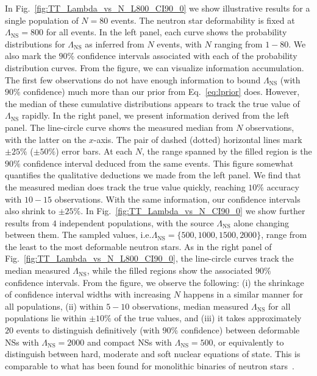 \documentclass[aps,prd,amsmath,floats,floatfix, twocolumn,
superscriptaddress,nofootinbib,showpacs]{revtex4-1}
\newcommand{\lambdans}{\Lambda_\mathrm{NS}}
\begin{document}
In Fig.~\ref{fig:TT_Lambda_vs_N_L800_CI90_0} we show illustrative results
for a single 
population of $N=80$ events. The neutron star deformability is fixed at
$\lambdans=800$ for all events. In the left panel, each curve shows the 
probability distributions for $\lambdans$ as inferred from $N$ events, with $N$
ranging from $1-80$. We also mark the $90\%$ confidence intervals associated
with each of the probability distribution curves. From the figure, we
can visualize information accumulation. The first few observations do not have
enough information to bound $\lambdans$ (with $90\%$ confidence) much more than
our prior from Eq.~\ref{eq:lprior} does. However, the median of these
cumulative distributions appears to track the true value of $\lambdans$ 
rapidly.
% 
In the right panel, we present information derived from the left panel.
The line-circle curve shows the measured median from $N$ observations, with
the latter on the $x$-axis. The pair of dashed (dotted) horizontal lines mark
$\pm25\%$ ($\pm50\%$) error bars. At each $N$, the range spanned by the 
filled region is the $90\%$ confidence interval deduced from the same 
events. This figure somewhat quantifies the qualitative deductions we made
from the left panel. We find that the measured median does track the true value
quickly, reaching $10\%$ accuracy with $10-15$ observations. With the same
information, our confidence intervals also shrink to $\pm 25\%$.
% 
In Fig.~\ref{fig:TT_Lambda_vs_N_CI90_0} we show further results from $4$
independent populations, with the source $\lambdans$ alone changing between
them. The sampled values, i.e.$\lambdans=\{500,1000,1500,2000\}$, 
range from the least to the most deformable neutron stars. As in the 
right panel of Fig.~\ref{fig:TT_Lambda_vs_N_L800_CI90_0}, the line-circle curves
track the median measured $\lambdans$, while the filled regions show
the associated $90\%$ confidence intervals. From the figure, we observe
the following: (i) the shrinkage of confidence interval widths with increasing
$N$ happens in a similar manner for all 
populations, (ii) within $5-10$ observations, median measured $\lambdans$ for
all populations lie within $\pm10\%$ of the true values, and (iii) it takes
approximately $20$ events to distinguish definitively (with $90\%$ confidence)
between deformable NSs with $\lambdans=2000$ and compact NSs with 
$\lambdans=500$, or equivalently to distinguish between hard, moderate and soft
nuclear equations of state. This is comparable to what has been found for
monolithic binaries of neutron stars~\cite{DelPozzo:13,Chatziioannou:2015uea,
Agathos:2015a}.
\end{document}
